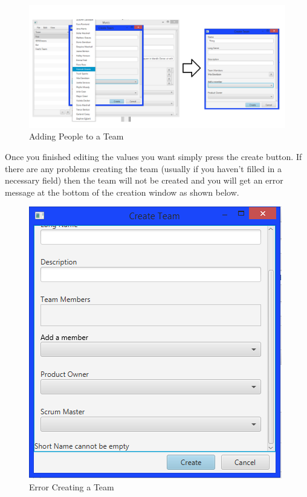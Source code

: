 \begin{figure}[H]
\centering
\includegraphics[width=\textwidth]{images/screenshots/teams2.PNG}
\caption{Adding People to a Team}
\label{fig:new_project}
\end{figure}

Once you finished editing the values you want simply press the create button. If there are any problems creating the team (usually if you haven't filled in a necessary field) then the team will not be created and you will get an error message at the bottom of the creation window as shown below.

\begin{figure}[H]
\centering
\includegraphics[width=\textwidth]{images/screenshots/teams3.PNG}
\caption{Error Creating a Team}
\label{fig:new_project}
\end{figure}

